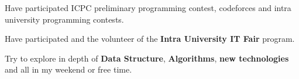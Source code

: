 

\begin{cventries}

    \cventry
    {} {} {} {}
    {
      \begin{cvitems} %
        \item {Have participated ICPC preliminary programming contest, codeforces and intra university programming contests.}
        \item {Have participated and the volunteer of the \textbf{Intra University IT Fair} program.}
        \item { Try to explore in depth of \textbf{Data Structure}, \textbf{Algorithms}, \textbf{new technologies} and all in my weekend or free time. }
      \end{cvitems}
    }



\end{cventries}
